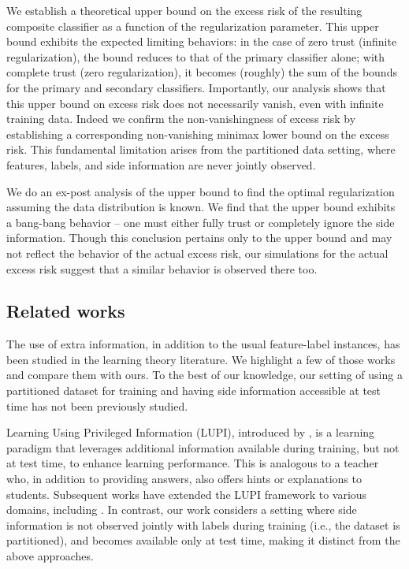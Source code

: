 We establish a theoretical upper bound on the excess risk of the resulting composite classifier as a function of the regularization parameter. This upper bound exhibits the expected limiting behaviors: in the case of zero trust (infinite regularization), the bound reduces to that of the primary classifier alone; with complete trust (zero regularization), it becomes (roughly) the sum of the bounds for the primary and secondary classifiers. Importantly, our analysis shows that this upper bound on excess risk does not necessarily vanish, even with infinite training data. Indeed we confirm the non-vanishingness of excess risk by establishing a corresponding non-vanishing minimax lower bound on the excess risk. This fundamental limitation arises from the partitioned data setting, where features, labels, and side information are never jointly observed.


We do an ex-post analysis  of the upper bound to find the optimal regularization assuming the data distribution is known. We find that the upper bound exhibits a bang-bang behavior -- one must either fully trust or completely ignore the side information. Though this conclusion pertains only to the upper bound and may not reflect the behavior of the actual excess risk, our simulations for the actual excess risk suggest that a similar behavior is observed there too.


\subsection{Related works}

The use of extra information, in addition to the usual feature-label instances, has been studied in the learning theory literature. We highlight a few of those works and compare them with ours. To the best of our knowledge, our setting of using a partitioned dataset for training and having side information accessible at test time has not been previously studied.

Learning Using Privileged Information (LUPI), introduced by \cite{vapnik2009new}, is a learning paradigm that leverages additional information available during training, but not at test time, to enhance learning performance. This is analogous to a teacher who, in addition to providing answers, also offers hints or explanations to students.
Subsequent works have extended the LUPI framework to various domains, including \cite{vapnik2015learning, sacco2021neural, song2021learning, wang2018learning}. In contrast, our work considers a setting where side information is not observed jointly with labels during training (i.e., the dataset is partitioned), and becomes available only at test time, making it distinct from the above approaches.

